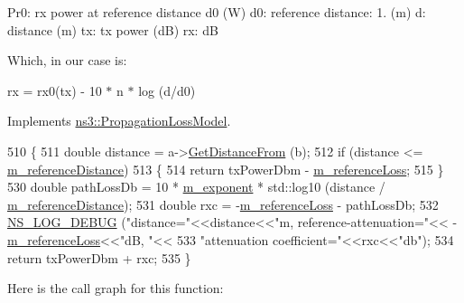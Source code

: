 Pr0\+: rx power at reference distance d0 (W) d0\+: reference distance\+: 1. (m) d\+: distance (m) tx\+: tx power (dB) rx\+: dB

Which, in our case is\+:

rx = rx0(tx) -\/ 10 $\ast$ n $\ast$ log (d/d0)

Implements \hyperlink{classns3_1_1PropagationLossModel_aa6bb73e4132dc5d8e1b49750955838bb}{ns3\+::\+Propagation\+Loss\+Model}.


\begin{DoxyCode}
510 \{
511   \textcolor{keywordtype}{double} distance = a->\hyperlink{classns3_1_1MobilityModel_afa16c20b3c5fd135be075000f0272f31}{GetDistanceFrom} (b);
512   \textcolor{keywordflow}{if} (distance <= \hyperlink{classns3_1_1LogDistancePropagationLossModel_a1e40651f77e1aa2226eac1668b5bc22c}{m\_referenceDistance})
513     \{
514       \textcolor{keywordflow}{return} txPowerDbm - \hyperlink{classns3_1_1LogDistancePropagationLossModel_ad5065bb57e5dc5863189ab6e014080a0}{m\_referenceLoss};
515     \}
530   \textcolor{keywordtype}{double} pathLossDb = 10 * \hyperlink{classns3_1_1LogDistancePropagationLossModel_a70538e0d462564ad358ead5ab67aa3db}{m\_exponent} * std::log10 (distance / 
      \hyperlink{classns3_1_1LogDistancePropagationLossModel_a1e40651f77e1aa2226eac1668b5bc22c}{m\_referenceDistance});
531   \textcolor{keywordtype}{double} rxc = -\hyperlink{classns3_1_1LogDistancePropagationLossModel_ad5065bb57e5dc5863189ab6e014080a0}{m\_referenceLoss} - pathLossDb;
532   \hyperlink{group__logging_ga413f1886406d49f59a6a0a89b77b4d0a}{NS\_LOG\_DEBUG} (\textcolor{stringliteral}{"distance="}<<distance<<\textcolor{stringliteral}{"m, reference-attenuation="}<< -
      \hyperlink{classns3_1_1LogDistancePropagationLossModel_ad5065bb57e5dc5863189ab6e014080a0}{m\_referenceLoss}<<\textcolor{stringliteral}{"dB, "}<<
533                 \textcolor{stringliteral}{"attenuation coefficient="}<<rxc<<\textcolor{stringliteral}{"db"});
534   \textcolor{keywordflow}{return} txPowerDbm + rxc;
535 \}
\end{DoxyCode}


Here is the call graph for this function\+:


